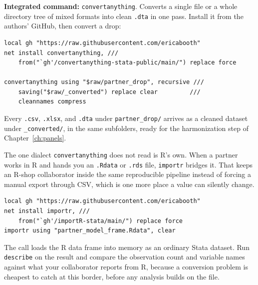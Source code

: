 \begin{kaobox}[frametitle=Package Integration: \texttt{convertanything}]
\textbf{Integrated command:} \texttt{convertanything}. Converts a single file or a whole directory tree of mixed formats into clean \texttt{.dta} in one pass. Install it from the authors' GitHub, then convert a drop:
\par
{\footnotesize
\begin{verbatim}
local gh "https://raw.githubusercontent.com/ericabooth"
net install convertanything, ///
    from("`gh'/convertanything-stata-public/main/") replace force

convertanything using "$raw/partner_drop", recursive ///
    saving("$raw/_converted") replace clear         ///
    cleannames compress
\end{verbatim}
}
Every \texttt{.csv}, \texttt{.xlsx}, and \texttt{.dta} under \texttt{partner\_drop/} arrives as a cleaned dataset under \texttt{\_converted/}, in the same subfolders, ready for the harmonization step of Chapter~\ref{ch:panels}.
\end{kaobox}

The one dialect \texttt{convertanything} does not read is R's own. When a partner works in R and hands you an \texttt{.Rdata} or \texttt{.rds} file, \texttt{importr} bridges it. That keeps an R-shop collaborator inside the same reproducible pipeline instead of forcing a manual export through CSV, which is one more place a value can silently change.
\par
{\footnotesize
\begin{verbatim}
local gh "https://raw.githubusercontent.com/ericabooth"
net install importr, ///
    from("`gh'/importR-stata/main/") replace force
importr using "partner_model_frame.Rdata", clear
\end{verbatim}
}
The call loads the R data frame into memory as an ordinary Stata dataset. Run \texttt{describe} on the result and compare the observation count and variable names against what your collaborator reports from R, because a conversion problem is cheapest to catch at this border, before any analysis builds on the file.

